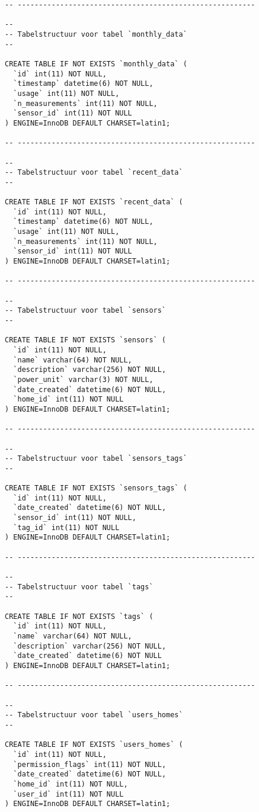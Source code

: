 \documentclass[11pt]{article}
\begin{document}
\begin{lstlisting}[style=SQL]
-- --------------------------------------------------------

--
-- Tabelstructuur voor tabel `monthly_data`
--

CREATE TABLE IF NOT EXISTS `monthly_data` (
  `id` int(11) NOT NULL,
  `timestamp` datetime(6) NOT NULL,
  `usage` int(11) NOT NULL,
  `n_measurements` int(11) NOT NULL,
  `sensor_id` int(11) NOT NULL
) ENGINE=InnoDB DEFAULT CHARSET=latin1;

-- --------------------------------------------------------

--
-- Tabelstructuur voor tabel `recent_data`
--

CREATE TABLE IF NOT EXISTS `recent_data` (
  `id` int(11) NOT NULL,
  `timestamp` datetime(6) NOT NULL,
  `usage` int(11) NOT NULL,
  `n_measurements` int(11) NOT NULL,
  `sensor_id` int(11) NOT NULL
) ENGINE=InnoDB DEFAULT CHARSET=latin1;

-- --------------------------------------------------------

--
-- Tabelstructuur voor tabel `sensors`
--

CREATE TABLE IF NOT EXISTS `sensors` (
  `id` int(11) NOT NULL,
  `name` varchar(64) NOT NULL,
  `description` varchar(256) NOT NULL,
  `power_unit` varchar(3) NOT NULL,
  `date_created` datetime(6) NOT NULL,
  `home_id` int(11) NOT NULL
) ENGINE=InnoDB DEFAULT CHARSET=latin1;

-- --------------------------------------------------------

--
-- Tabelstructuur voor tabel `sensors_tags`
--

CREATE TABLE IF NOT EXISTS `sensors_tags` (
  `id` int(11) NOT NULL,
  `date_created` datetime(6) NOT NULL,
  `sensor_id` int(11) NOT NULL,
  `tag_id` int(11) NOT NULL
) ENGINE=InnoDB DEFAULT CHARSET=latin1;

-- --------------------------------------------------------

--
-- Tabelstructuur voor tabel `tags`
--

CREATE TABLE IF NOT EXISTS `tags` (
  `id` int(11) NOT NULL,
  `name` varchar(64) NOT NULL,
  `description` varchar(256) NOT NULL,
  `date_created` datetime(6) NOT NULL
) ENGINE=InnoDB DEFAULT CHARSET=latin1;

-- --------------------------------------------------------

--
-- Tabelstructuur voor tabel `users_homes`
--

CREATE TABLE IF NOT EXISTS `users_homes` (
  `id` int(11) NOT NULL,
  `permission_flags` int(11) NOT NULL,
  `date_created` datetime(6) NOT NULL,
  `home_id` int(11) NOT NULL,
  `user_id` int(11) NOT NULL
) ENGINE=InnoDB DEFAULT CHARSET=latin1;


\end{lstlisting}
\end{document}
